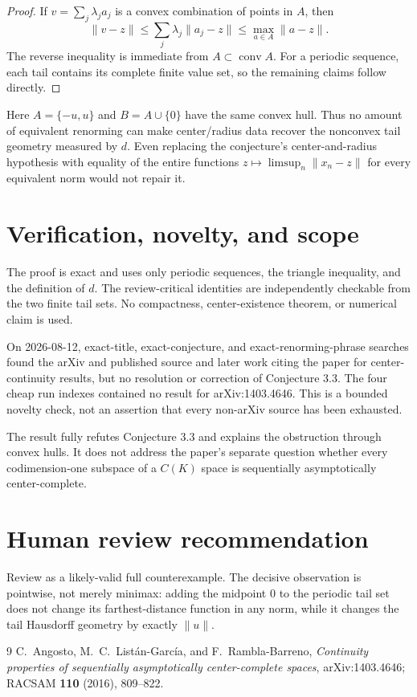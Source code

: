 \documentclass[11pt]{article}
\newcommand{\conv}{\operatorname{conv}}
\begin{document}
\begin{proof}
If $v=\sum_j\lambda_j a_j$ is a convex combination of points in $A$, then
\[
 \|v-z\|\le\sum_j\lambda_j\|a_j-z\|
 \le\max_{a\in A}\|a-z\|.
\]
The reverse inequality is immediate from $A\subset\conv A$.  For a periodic
sequence, each tail contains its complete finite value set, so the remaining
claims follow directly.
\end{proof}

Here $A=\{-u,u\}$ and $B=A\cup\{0\}$ have the same convex hull.  Thus no
amount of equivalent renorming can make center/radius data recover the
nonconvex tail geometry measured by $d$.  Even replacing the conjecture's
center-and-radius hypothesis with equality of the entire functions
$z\mapsto\limsup_n\|x_n-z\|$ for every equivalent norm would not repair it.

\section*{Verification, novelty, and scope}

The proof is exact and uses only periodic sequences, the triangle inequality,
and the definition of $d$.  The review-critical identities are independently
checkable from the two finite tail sets.  No compactness, center-existence
theorem, or numerical claim is used.

On 2026-08-12, exact-title, exact-conjecture, and exact-renorming-phrase
searches found the arXiv and published source and later work citing the paper
for center-continuity results, but no resolution or correction of Conjecture
3.3.  The four cheap run indexes contained no result for arXiv:1403.4646.
This is a bounded novelty check, not an assertion that every non-arXiv source
has been exhausted.

The result fully refutes Conjecture 3.3 and explains the obstruction through
convex hulls.  It does not address the paper's separate question whether every
codimension-one subspace of a $C(K)$ space is sequentially asymptotically
center-complete.

\section*{Human review recommendation}

Review as a likely-valid full counterexample.  The decisive observation is
pointwise, not merely minimax: adding the midpoint $0$ to the periodic tail set
does not change its farthest-distance function in any norm, while it changes
the tail Hausdorff geometry by exactly $\|u\|$.

\begin{thebibliography}{9}
C.~Angosto, M.~C.~List\'an-Garc\'ia, and F.~Rambla-Barreno,
\emph{Continuity properties of sequentially asymptotically center-complete
spaces}, arXiv:1403.4646; RACSAM \textbf{110} (2016), 809--822.
\end{thebibliography}
\end{document}
